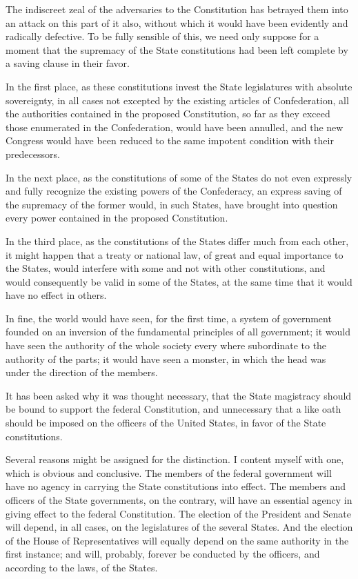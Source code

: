 The indiscreet zeal of the adversaries to the Constitution has betrayed them into an attack on this part of it also, without which it would have been evidently and radically defective. To be fully sensible of this, we need only suppose for a moment that the supremacy of the State constitutions had been left complete by a saving clause in their favor.

In the first place, as these constitutions invest the State legislatures with absolute sovereignty, in all cases not excepted by the existing articles of Confederation, all the authorities contained in the proposed Constitution, so far as they exceed those enumerated in the Confederation, would have been annulled, and the new Congress would have been reduced to the same impotent condition with their predecessors.

In the next place, as the constitutions of some of the States do not even expressly and fully recognize the existing powers of the Confederacy, an express saving of the supremacy of the former would, in such States, have brought into question every power contained in the proposed Constitution.

In the third place, as the constitutions of the States differ much from each other, it might happen that a treaty or national law, of great and equal importance to the States, would interfere with some and not with other constitutions, and would consequently be valid in some of the States, at the same time that it would have no effect in others.

In fine, the world would have seen, for the first time, a system of government founded on an inversion of the fundamental principles of all government; it would have seen the authority of the whole society every where subordinate to the authority of the parts; it would have seen a monster, in which the head was under the direction of the members.

It has been asked why it was thought necessary, that the State magistracy should be bound to support the federal Constitution, and unnecessary that a like oath should be imposed on the officers of the United States, in favor of the State constitutions.

Several reasons might be assigned for the distinction. I content myself with one, which is obvious and conclusive. The members of the federal government will have no agency in carrying the State constitutions into effect. The members and officers of the State governments, on the contrary, will have an essential agency in giving effect to the federal Constitution. The election of the President and Senate will depend, in all cases, on the legislatures of the several States. And the election of the House of Representatives will equally depend on the same authority in the first instance; and will, probably, forever be conducted by the officers, and according to the laws, of the States.


